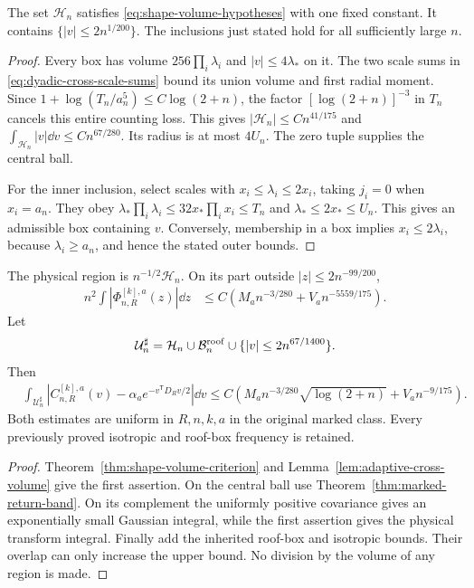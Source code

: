 \begin{lemma}
\label{lem:adaptive-cross-volume}
The set $\mathcal H_n$ satisfies \eqref{eq:shape-volume-hypotheses}
with one fixed constant. It contains $\{|v|\le2n^{1/200}\}$.
The inclusions just stated hold for all sufficiently large $n$.
\end{lemma}
\begin{proof}
Every box has volume $256\prod_i\lambda_i$ and
$|v|\le4\lambda_*$ on it. The two scale sums in
\eqref{eq:dyadic-cross-scale-sums} bound its union volume and first
radial moment. Since $1+\log(T_n/a_n^5)\le C\log(2+n)$, the
factor $[\log(2+n)]^{-3}$ in $T_n$ cancels this entire counting
loss. This gives $|\mathcal H_n|\le Cn^{41/175}$ and
$\int_{\mathcal H_n}|v|\dd v\le Cn^{67/280}$. Its radius is at
most $4U_n$. The zero tuple supplies the central ball.

For the inner inclusion, select scales with
$x_i\le\lambda_i\le2x_i$, taking $j_i=0$ when $x_i=a_n$.
They obey $\lambda_*\prod_i\lambda_i\le32x_*\prod_i x_i\le T_n$
and $\lambda_*\le2x_*\le U_n$. This gives an admissible box
containing $v$. Conversely, membership in a box implies
$x_i\le2\lambda_i$, because $\lambda_i\ge a_n$, and hence the
stated outer bounds.
\end{proof}

\begin{theorem}
\label{thm:adaptive-cross-fixed-count}
The physical region is $n^{-1/2}\mathcal H_n$. On its part outside
$|z|\le2n^{-99/200}$,
\begin{align}
 n^2\int |\Phi^{[k],a}_{n,R}(z)|\dd z
       &\le C\left(M_an^{-3/280}+V_an^{-5559/175}\right).
 \label{eq:adaptive-cross-fixed-count}
\end{align}
Let
\begin{equation}\label{eq:adaptive-cross-retained-union}
 \mathcal U_n^\sharp=\mathcal H_n\cup\mathcal B_n^{\rm roof}
                         \cup\{|v|\le2n^{67/1400}\}.
\end{equation}
Then
\begin{align}
 &\int_{\mathcal U_n^\sharp}
 |C^{[k],a}_{n,R}(v)-\alpha_a e^{-v^{\mathsf T}D_Rv/2}|\dd v
 \le C\left(M_an^{-3/280}\sqrt{\log(2+n)}+V_an^{-9/175}\right).
 \label{eq:adaptive-cross-central}
\end{align}
Both estimates are uniform in $R,n,k,a$ in the original marked class.
Every previously proved isotropic and roof-box frequency is retained.
\end{theorem}
\begin{proof}
Theorem~\ref{thm:shape-volume-criterion} and
Lemma~\ref{lem:adaptive-cross-volume} give the first assertion. On
the central ball use Theorem~\ref{thm:marked-return-band}. On its
complement the uniformly positive covariance gives an exponentially
small Gaussian integral, while the first assertion gives the physical
transform integral. Finally add the inherited roof-box and isotropic
bounds. Their overlap can only increase the upper bound. No division
by the volume of any region is made.
\end{proof}


